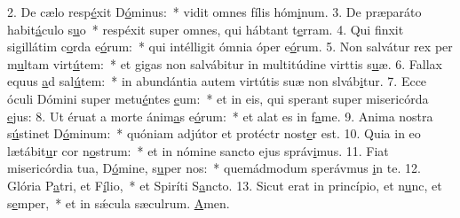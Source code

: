 2. De cælo resp\uline{é}xit D\uline{ó}minus:~* vidit omnes fílis hóm\uline{i}num.
3. De præparáto habit\uline{á}culo s\uline{u}o~* respéxit super omnes, qui hábtant t\uline{e}rram.
4. Qui finxit sigillátim c\uline{o}rda e\uline{ó}rum:~* qui intélligit ómnia óper e\uline{ó}rum.
5. Non salvátur rex per m\uline{u}ltam virt\uline{ú}tem:~* et gigas non salvábitur in multitúdine virttis s\uline{u}æ.
6. Fallax equus \uline{a}d sal\uline{ú}tem:~* in abundántia autem virtútis suæ non slváb\uline{i}tur.
7. Ecce óculi Dómini super metu\uline{é}ntes \uline{e}um:~* et in eis, qui sperant super misericórda \uline{e}jus:
8. Ut éruat a morte ánim\uline{a}s e\uline{ó}rum:~* et alat es in f\uline{a}me.
9. Anima nostra s\uline{ú}stinet D\uline{ó}minum:~* quóniam adjútor et protéctr nost\uline{e}r est.
10. Quia in eo lætábit\uline{u}r cor n\uline{o}strum:~* et in nómine sancto ejus správ\uline{i}mus.
11. Fiat misericórdia tua, D\uline{ó}mine, s\uline{u}per nos:~* quemádmodum sperávmus \uline{i}n te.
12. Glória P\uline{a}tri, et F\uline{í}lio,~* et Spiríti S\uline{a}ncto.
13. Sicut erat in princípio, et n\uline{u}nc, et s\uline{e}mper,~* et in sǽcula sæculrum. \uline{A}men.

